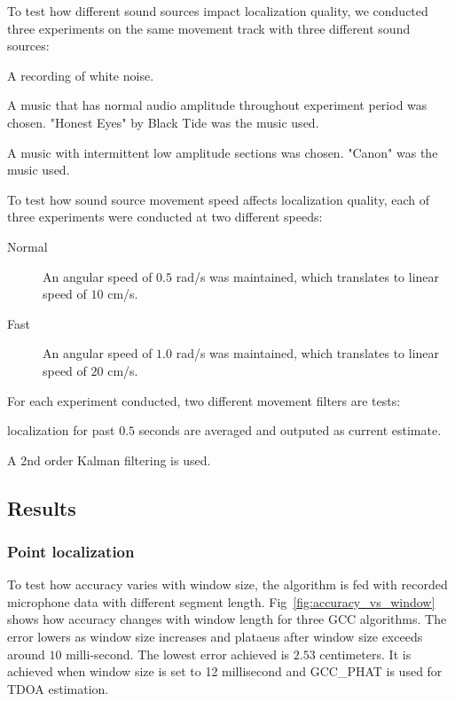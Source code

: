 To test how different sound sources impact localization quality, we conducted three experiments on the same movement track with three different sound sources:

\begin{description}

\item[White Noise] A recording of white noise.

\item[Music A] A music that has normal audio amplitude throughout experiment period was chosen. "Honest Eyes" by Black Tide was the music used.

\item[Music B] A music with intermittent low amplitude sections was chosen. "Canon" was the music used.

\end{description} 

To test how sound source movement speed affects localization quality, each of three experiments were conducted at two different speeds:
\begin{description}
\item[Normal] An angular speed of $0.5$ rad/s was maintained, which translates to linear speed of $10$ cm/s.
\item[Fast] An angular speed of $1.0$ rad/s was maintained, which translates to linear speed of $20$ cm/s.
\end{description}

For each experiment conducted, two different movement filters are tests:
\begin{description}
\item[Averaging filter] localization for past $0.5$ seconds are averaged and outputed as current estimate.
\item[Kalman filter] A 2nd order Kalman filtering is used.
\end{description}

\subsection{Results}
\subsubsection{Point localization}

To test how accuracy varies with window size, the algorithm is fed with recorded microphone data with different segment length. Fig~\ref{fig:accuracy_vs_window} shows how accuracy changes with window length for three GCC algorithms. The error lowers as window size increases and plataeus after window size exceeds around $10$ milli-second. The lowest error achieved is $2.53$ centimeters. It is achieved when window size is set to 12 millisecond and GCC\_PHAT is used for TDOA estimation.

